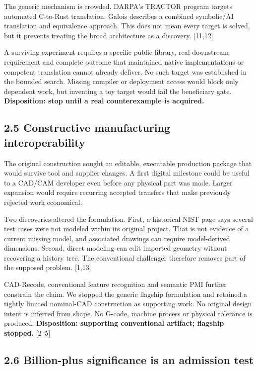 \documentclass[11pt,letterpaper]{article}
\begin{document}
The generic mechanism is crowded. DARPA's TRACTOR program targets automated C-to-Rust translation; Galois describes a combined symbolic/AI translation and equivalence approach. This does not mean every target is solved, but it prevents treating the broad architecture as a discovery. {[}11,12{]}

A surviving experiment requires a specific public library, real downstream requirement and complete outcome that maintained native implementations or competent translation cannot already deliver. No such target was established in the bounded search. Missing compiler or deployment access would block only dependent work, but inventing a toy target would fail the beneficiary gate. \textbf{Disposition: stop until a real counterexample is acquired.}

\hypertarget{constructive-manufacturing-interoperability}{%
\subsection{2.5 Constructive manufacturing interoperability}\label{constructive-manufacturing-interoperability}}

The original construction sought an editable, executable production package that would survive tool and supplier changes. A first digital milestone could be useful to a CAD/CAM developer even before any physical part was made. Larger expansion would require recurring accepted transfers that make previously rejected work economical.

Two discoveries altered the formulation. First, a historical NIST page says several test cases were not modeled within its original project. That is not evidence of a current missing model, and associated drawings can require model-derived dimensions. Second, direct modeling can edit imported geometry without recovering a history tree. The conventional challenger therefore removes part of the supposed problem. {[}1,13{]}

CAD-Recode, conventional feature recognition and semantic PMI further constrain the claim. We stopped the generic flagship formulation and retained a tightly limited nominal-CAD construction as supporting work. No original design intent is inferred from shape. No G-code, machine process or physical tolerance is produced. \textbf{Disposition: supporting conventional artifact; flagship stopped.} {[}2--5{]}

\hypertarget{billion-plus-significance-is-an-admission-test}{%
\subsection{2.6 Billion-plus significance is an admission test}\label{billion-plus-significance-is-an-admission-test}}
\end{document}
